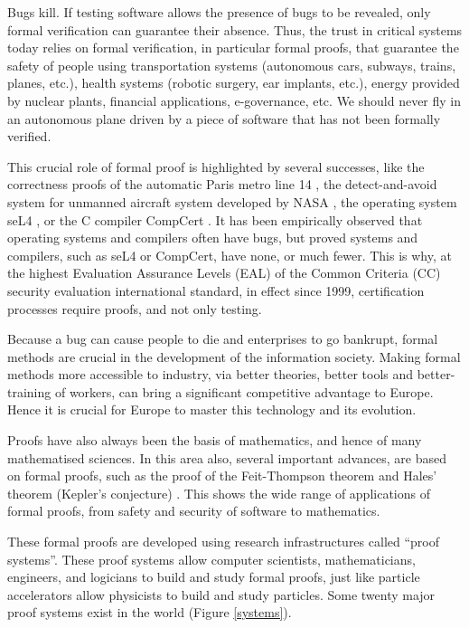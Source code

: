 \thispagestyle{empty}

Bugs kill.  If testing software allows the presence of bugs to be
revealed, only formal verification can guarantee their absence.
Thus, the
trust in critical systems today relies on formal verification, in
particular formal proofs, that guarantee the safety of people
using transportation systems (autonomous cars, subways, trains,
planes, etc.), health systems (robotic surgery, ear implants, etc.), energy provided
by nuclear plants, financial applications, e-governance, etc.  We
should never fly in an autonomous plane driven by a piece of software
that has not been formally verified.

This crucial role of formal proof is highlighted by several successes,
like the correctness proofs of the automatic Paris metro line 14
\cite{Behm98,Lecomte17}, the detect-and-avoid system for unmanned aircraft
system developed by NASA \cite{Munoz16}, the operating system seL4
\cite{Klein09}, or the C compiler CompCert \cite{Leroy06}.  It has
been empirically observed that operating systems and compilers
often
have bugs, but proved systems and compilers, such as seL4 or CompCert, have
none, or
much fewer.  This is why, at the highest Evaluation Assurance Levels (EAL)
of the Common Criteria (CC) security evaluation international standard, in
effect since 1999, certification processes require proofs, and not
only testing.

Because a bug can cause people to die and enterprises to go bankrupt,
formal methods are crucial in the development of the information
society. Making formal methods more accessible to industry, via
better theories, better tools and better-training of workers, can
bring a significant competitive advantage to Europe.  Hence it is
crucial for Europe to master this technology and its evolution.

Proofs have also always been the basis of mathematics, and hence of
many mathematised sciences. In this area also, several important
advances, are based on formal proofs, such as the proof of the
Feit-Thompson theorem \cite{Gonthier13} and Hales' theorem (Kepler's
conjecture) \cite{Hales17}. This shows the wide range of applications of
formal proofs, from safety and security of software to mathematics.

These formal proofs are developed using research infrastructures called
``proof systems''.  These proof systems allow computer scientists,
mathematicians, engineers, and logicians to build and study formal
proofs, just like particle accelerators allow physicists to build and
study particles.  Some twenty major proof systems exist in the world
(Figure \ref{systems}).

